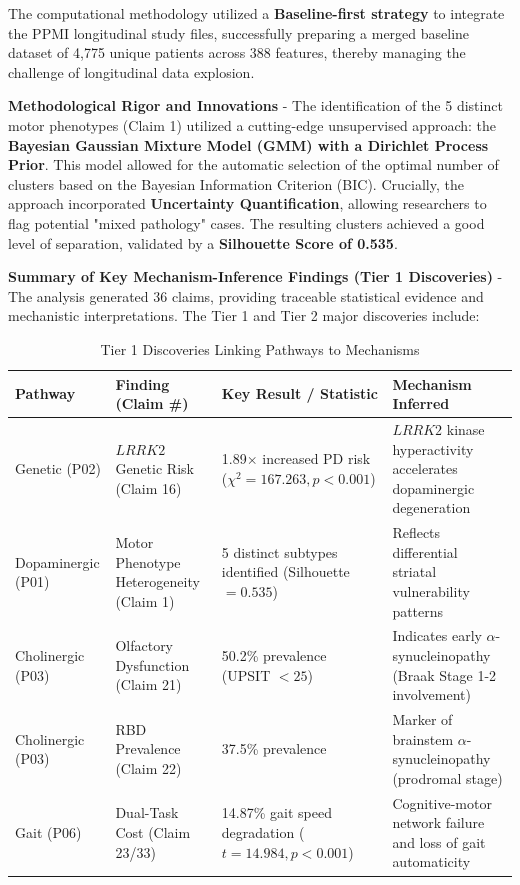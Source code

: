 \documentclass[11pt]{article}
\begin{document}
The computational methodology utilized a \textbf{Baseline-first strategy} to integrate the PPMI longitudinal study files, successfully preparing a merged baseline dataset of 4,775 unique patients across 388 features, thereby managing the challenge of longitudinal data explosion.

\textbf{Methodological Rigor and Innovations} - 
The identification of the 5 distinct motor phenotypes (Claim 1) utilized a cutting-edge unsupervised approach: the \textbf{Bayesian Gaussian Mixture Model (GMM) with a Dirichlet Process Prior}. This model allowed for the automatic selection of the optimal number of clusters based on the Bayesian Information Criterion (BIC). Crucially, the approach incorporated \textbf{Uncertainty Quantification}, allowing researchers to flag potential "mixed pathology" cases. The resulting clusters achieved a good level of separation, validated by a \textbf{Silhouette Score of 0.535}.

\textbf{Summary of Key Mechanism-Inference Findings (Tier 1 Discoveries)} - 
The analysis generated 36 claims, providing traceable statistical evidence and mechanistic interpretations. The Tier 1 and Tier 2 major discoveries include:

\begin{table}[H]
\centering
\caption{Tier 1 Discoveries Linking Pathways to Mechanisms \cite{tirhekar2025comprehensive}}
\label{tab:mechanism_tier1_findings}
\small
\begin{tabularx}{\linewidth}{@{}Y Y Y Y@{}}
\toprule
\textbf{Pathway} & \textbf{Finding (Claim \#)} & \textbf{Key Result / Statistic} & \textbf{Mechanism Inferred} \\
\midrule
Genetic (P02) & $LRRK2$ Genetic Risk (Claim 16) & 1.89$\times$ increased PD risk ($\chi^2=167.263, p<0.001$) & $LRRK2$ kinase hyperactivity accelerates dopaminergic degeneration \\
Dopaminergic (P01) & Motor Phenotype Heterogeneity (Claim 1) & 5 distinct subtypes identified (Silhouette $\mathbf{=0.535}$) & Reflects differential striatal vulnerability patterns \\
Cholinergic (P03) & Olfactory Dysfunction (Claim 21) & 50.2\% prevalence (UPSIT $< 25$) & Indicates early $\alpha$-synucleinopathy (Braak Stage 1-2 involvement) \\
Cholinergic (P03) & RBD Prevalence (Claim 22) & 37.5\% prevalence & Marker of brainstem $\alpha$-synucleinopathy (prodromal stage) \\
Gait (P06) & Dual-Task Cost (Claim 23/33) & 14.87\% gait speed degradation ($t=14.984, p<0.001$) & Cognitive-motor network failure and loss of gait automaticity \\
\bottomrule
\end{tabularx}
\end{table}
\end{document}
